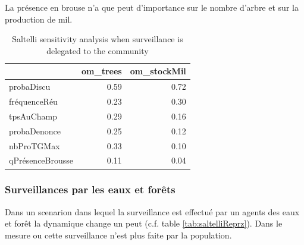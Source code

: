 \documentclass{article}
\begin{document}
        La présence en brouse n'a que peut d'importance sur le nombre d'arbre et sur la production de mil. 

        \begin{table}
            \centering\begingroup\fontsize{10}{12}\selectfont
            
                \begin{tabular}[]{lrr}
                    \toprule
                    ~ & om\_trees & om\_stockMil\\
                    \hline
                    \addlinespace
                    probaDiscu & 0.59 & 0.72\\
                    fréquenceRéu & 0.23 & 0.30\\
                    tpsAuChamp & 0.29 & 0.16\\
                    probaDenonce & 0.25 & 0.12\\
                    nbProTGMax & 0.33 & 0.10\\
                    qPrésenceBrousse & 0.11 & 0.04\\
                    \bottomrule
                \end{tabular}
            \caption{Saltelli sensitivity analysis when surveillance is delegated to the community}
            \label{tab:saltelliCom}
            \endgroup{}
        \end{table}

    \subsubsection{Surveillances par les eaux et forêts}

        Dans un scenarion dans lequel la surveillance est effectué par un agents des eaux et forêt la dynamique change un peut (c.f. table \ref{tab:saltelliReprz}). Dans le mesure ou cette surveillance n'est plus faite par la population. 
\end{document}
